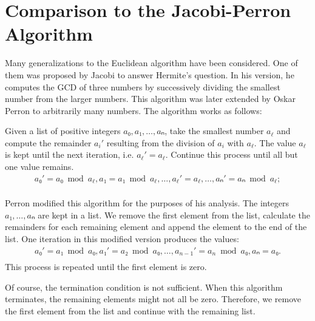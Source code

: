 
\begin{example}

\end{example}

\section{Comparison to the Jacobi-Perron Algorithm}

Many generalizations to the Euclidean algorithm have been considered.
One of them was proposed by Jacobi to answer Hermite's question.
In his version, he computes the GCD of three numbers by successively dividing
the smallest number from the larger numbers.
This algorithm was later extended by Oskar Perron to arbitrarily many numbers.
The algorithm works as follows:

Given a list of positive integers $a₀, a₁, …, aₙ$, take the smallest number $a_ℓ$
and compute the remainder $a_i'$ resulting from the division of $a_i$ with $a_ℓ$.
The value $a_ℓ$ is kept until the next iteration, i.e. $a_ℓ' = a_ℓ$.
Continue this process until all but one value remains.
\begin{align*}
  a₀' = a₀ \bmod a_ℓ, a₁ = a₁ \bmod a_ℓ, …, a_ℓ' = a_ℓ, …, aₙ' = aₙ \bmod a_ℓ; \\
\end{align*}

Perron modified this algorithm for the purposes of his analysis.
The integers $a₁, …, aₙ$ are kept in a list.
We remove the first element from the list, calculate the remainders for each
remaining element and append the element to the end of the list.
One iteration in this modified version produces the values:
\begin{align*}
  a₀' = a₁ \bmod a₀, a₁' = a₂ \bmod a₀, …, a_{n-1}' = a_n \bmod a₀, aₙ = a₀. \\
\end{align*}
This process is repeated until the first element is zero.

Of course, the termination condition is not sufficient.
When this algorithm terminates, the remaining elements might not all be zero.
Therefore, we remove the first element from the list and continue with the
remaining list.

